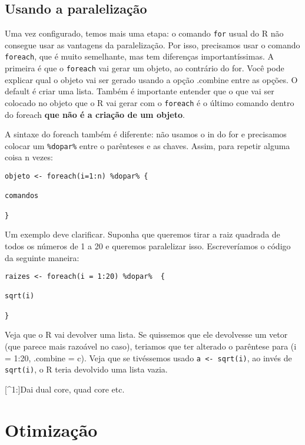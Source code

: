\documentclass[]{book}
\begin{document}
\section{Usando a paralelização}\label{usando-a-paralelizacao}

Uma vez configurado, temos mais uma etapa: o comando \texttt{for} usual
do R não consegue usar as vantagens da paralelização. Por isso,
precisamos usar o comando \texttt{foreach}, que é muito semelhante, mas
tem diferenças importantíssimas. A primeira é que o \texttt{foreach} vai
gerar um objeto, ao contrário do for. Você pode explicar qual o objeto
vai ser gerado usando a opção .combine entre as opções. O default é
criar uma lista. Também é importante entender que o que vai ser colocado
no objeto que o R vai gerar com o \texttt{foreach} é o último comando
dentro do foreach \textbf{que não é a criação de um objeto}.

A sintaxe do foreach também é diferente: não usamos o in do for e
precisamos colocar um \texttt{\%dopar\%} entre o parênteses e as chaves.
Assim, para repetir alguma coisa n vezes:

\begin{verbatim}
objeto <- foreach(i=1:n) %dopar% {

comandos

}
\end{verbatim}

Um exemplo deve clarificar. Suponha que queremos tirar a raiz quadrada
de todos os números de 1 a 20 e queremos paralelizar isso. Escreveríamos
o código da seguinte maneira:

\begin{verbatim}
raizes <- foreach(i = 1:20) %dopar%  {

sqrt(i)

}
\end{verbatim}

Veja que o R vai devolver uma lista. Se quissemos que ele devolvesse um
vetor (que parece mais razoável no caso), teriamos que ter alterado o
parêntese para (i = 1:20, .combine = c). Veja que se tivéssemos usado
\texttt{a\ \textless{}-\ sqrt(i)}, ao invés de \texttt{sqrt(i)}, o R
teria devolvido uma lista vazia.

{[}\^{}1:{]}Dai dual core, quad core etc.

\chapter{Otimização}\label{otimizacao}
\end{document}
